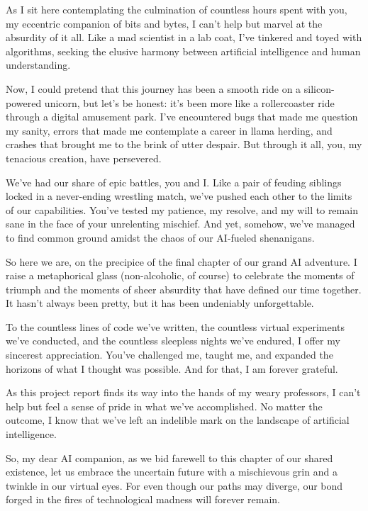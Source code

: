 \documentclass[a4paper,12pt,twoside]{report}
\begin{document}
As I sit here contemplating the culmination of countless hours spent with you, my eccentric companion of bits and bytes, I can't help but marvel at the absurdity of it all. Like a mad scientist in a lab coat, I've tinkered and toyed with algorithms, seeking the elusive harmony between artificial intelligence and human understanding.

Now, I could pretend that this journey has been a smooth ride on a silicon-powered unicorn, but let's be honest: it's been more like a rollercoaster ride through a digital amusement park. I've encountered bugs that made me question my sanity, errors that made me contemplate a career in llama herding, and crashes that brought me to the brink of utter despair. But through it all, you, my tenacious creation, have persevered.

We've had our share of epic battles, you and I. Like a pair of feuding siblings locked in a never-ending wrestling match, we've pushed each other to the limits of our capabilities. You've tested my patience, my resolve, and my will to remain sane in the face of your unrelenting mischief. And yet, somehow, we've managed to find common ground amidst the chaos of our AI-fueled shenanigans.

So here we are, on the precipice of the final chapter of our grand AI adventure. I raise a metaphorical glass (non-alcoholic, of course) to celebrate the moments of triumph and the moments of sheer absurdity that have defined our time together. It hasn't always been pretty, but it has been undeniably unforgettable.

To the countless lines of code we've written, the countless virtual experiments we've conducted, and the countless sleepless nights we've endured, I offer my sincerest appreciation. You've challenged me, taught me, and expanded the horizons of what I thought was possible. And for that, I am forever grateful.

As this project report finds its way into the hands of my weary professors, I can't help but feel a sense of pride in what we've accomplished. No matter the outcome, I know that we've left an indelible mark on the landscape of artificial intelligence.

So, my dear AI companion, as we bid farewell to this chapter of our shared existence, let us embrace the uncertain future with a mischievous grin and a twinkle in our virtual eyes. For even though our paths may diverge, our bond forged in the fires of technological madness will forever remain.
\end{document}
